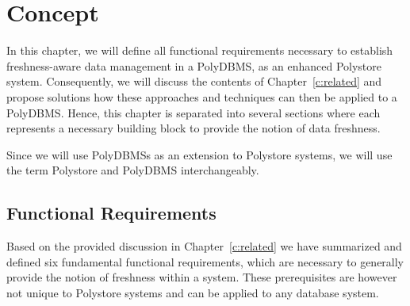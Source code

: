 \chapter{Concept}
\label{c:concept}


In this chapter, we will define all functional requirements necessary to establish freshness-aware data management in a PolyDBMS, as an enhanced Polystore system.
Consequently, we will discuss the contents of Chapter~\ref{c:related} and propose solutions how these approaches and techniques can then be applied to a PolyDBMS.
Hence, this chapter is separated into several sections where each represents a necessary building block to provide the notion of data freshness.


Since we will use PolyDBMSs as an extension to Polystore systems, we will use the term Polystore and PolyDBMS interchangeably.

\section{Functional Requirements}

Based on the provided discussion in Chapter~\ref{c:related} we have summarized and defined six fundamental functional
requirements, which are necessary to generally provide the notion of freshness within a system.
These prerequisites are however not unique to Polystore systems and can be applied to any database system. 

